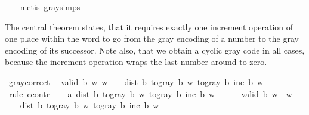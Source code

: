 \begin{isabellebody}
%
\isadelimproof
\ \ %
\endisadelimproof
%
\isatagproof
{}\isamarkupfalse%
\ {\isacharparenleft}{\kern0pt}metis\ gray{\isacharunderscore}{\kern0pt}simps{\isacharparenright}{\kern0pt}%
\endisatagproof
{\isafoldproof}%
%
\isadelimproof
%
\endisadelimproof
%
\begin{isamarkuptext}%
The central theorem states, that it requires exactly one increment operation
  of one place within the word to go from the gray encoding of a number to
  the gray encoding of its successor. Note also, that we obtain a cyclic
  gray code in all cases, because the increment operation wraps the last
  number around to zero.%
\end{isamarkuptext}\isamarkuptrue%
\isamarkupfalse%
\ gray{\isacharunderscore}{\kern0pt}correct{\isacharcolon}{\kern0pt}\isanewline
\ \ {\isachardoublequoteopen}{\isasymlbrakk}valid\ b\ w{\isacharsemicolon}{\kern0pt}\ w\ {\isasymnoteq}\ {\isacharbrackleft}{\kern0pt}{\isacharbrackright}{\kern0pt}{\isasymrbrakk}\ {\isasymLongrightarrow}\ dist\ b\ {\isacharparenleft}{\kern0pt}to{\isacharunderscore}{\kern0pt}gray\ b\ w{\isacharparenright}{\kern0pt}\ {\isacharparenleft}{\kern0pt}to{\isacharunderscore}{\kern0pt}gray\ b\ {\isacharparenleft}{\kern0pt}inc\ b\ w{\isacharparenright}{\kern0pt}{\isacharparenright}{\kern0pt}\ {\isacharequal}{\kern0pt}\ {}{\isachardoublequoteclose}\isanewline
%
\isadelimproof
%
\endisadelimproof
%
\isatagproof
{}\isamarkupfalse%
\ {\isacharparenleft}{\kern0pt}rule\ ccontr{\isacharparenright}{\kern0pt}\isanewline
\ \ \isamarkupfalse%
\ a{\isacharcolon}{\kern0pt}\ {\isachardoublequoteopen}dist\ b\ {\isacharparenleft}{\kern0pt}to{\isacharunderscore}{\kern0pt}gray\ b\ w{\isacharparenright}{\kern0pt}\ {\isacharparenleft}{\kern0pt}to{\isacharunderscore}{\kern0pt}gray\ b\ {\isacharparenleft}{\kern0pt}inc\ b\ w{\isacharparenright}{\kern0pt}{\isacharparenright}{\kern0pt}\ {\isasymnoteq}\ {}{\isachardoublequoteclose}\isanewline
\ \ \isamarkupfalse%
\ {\isachardoublequoteopen}valid\ b\ w{\isachardoublequoteclose}\ \ {\isachardoublequoteopen}w\ {\isasymnoteq}\ {\isacharbrackleft}{\kern0pt}{\isacharbrackright}{\kern0pt}{\isachardoublequoteclose}\isanewline
\ \ \isamarkupfalse%
\ {\isachardoublequoteopen}dist\ b\ {\isacharparenleft}{\kern0pt}to{\isacharunderscore}{\kern0pt}gray\ b\ w{\isacharparenright}{\kern0pt}\ {\isacharparenleft}{\kern0pt}to{\isacharunderscore}{\kern0pt}gray\ b\ {\isacharparenleft}{\kern0pt}inc\ b\ w{\isacharparenright}{\kern0pt}{\isacharparenright}{\kern0pt}\ {\isasymnoteq}\ {}{\isachardoublequoteclose}\ \isamarkupfalse%

\end{isabellebody}
